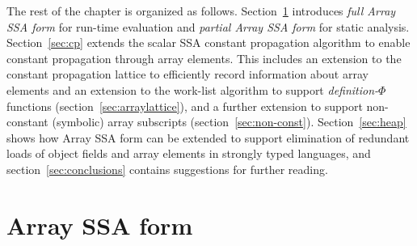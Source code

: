 The rest of the chapter is organized as follows.
Section~\ref{sec:arrayssa} introduces {\em full Array SSA form} for run-time
evaluation and {\em partial Array SSA form}
for static analysis.  
Section~\ref{sec:cp} extends the scalar SSA
constant propagation algorithm to enable
constant propagation through array elements.
This includes an extension to the constant
propagation lattice to efficiently
record information about array
elements and an extension to the
work-list algorithm to support  {\em definition-$\Phi$} functions (section~\ref{sec:arraylattice}), and
a further extension to support non-constant (symbolic) array
subscripts (section~\ref{sec:non-const}). 
Section~\ref{sec:heap} shows how Array SSA form can be extended to
support elimination of redundant loads of 
object fields and array elements in strongly typed languages,
and section~\ref{sec:conclusions} contains suggestions for further reading.

\section{Array SSA form}
\label{sec:arrayssa}





